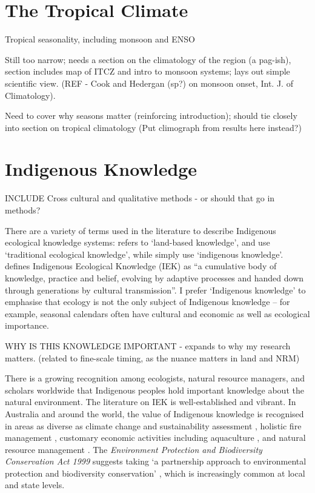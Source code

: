 \section{The Tropical Climate}

Tropical seasonality, including monsoon and ENSO

Still too narrow; needs a section on the climatology of the region (a pag-ish),
section includes map of ITCZ and intro to monsoon systems; lays out simple scientific view.
(REF - Cook and Hedergan (sp?) on monsoon onset, Int. J. of Climatology).

Need to cover why seasons matter (reinforcing introduction); should tie
closely into section on tropical climatology (Put climograph from results here instead?)





\section{Indigenous Knowledge}

INCLUDE Cross cultural and qualitative methods - or should that go in methods?


There are a variety of terms used in the literature to describe Indigenous 
ecological knowledge systems:  \citet{clarke2009} refers to `land-based knowledge', 
\citet{petheram2010} and \citet{turner2009} use `traditional ecological 
knowledge', while \citet{cochran2015} simply use `indigenous knowledge'.  
\citet{berkes2012} defines Indigenous Ecological Knowledge (IEK) as ``a cumulative 
body of knowledge, practice and belief, evolving by adaptive processes and 
handed down through generations by cultural transmission''.  I prefer 
`Indigenous knowledge' to emphasise that ecology is not the only subject of 
Indigenous knowledge – for example, seasonal calendars often have cultural and 
economic as well as ecological importance.

WHY IS THIS KNOWLEDGE IMPORTANT - expands to why my research matters.
(related to fine-scale timing, as the nuance matters in land and NRM)

There is a growing recognition among ecologists, natural resource managers, and 
scholars worldwide that Indigenous peoples hold important knowledge about the 
natural environment. The literature on IEK is well-established and vibrant.  In 
Australia and around the world, the value of Indigenous knowledge is recognised 
in areas as diverse as climate change and sustainability assessment
\citep[eg.][]{cochran2015}, holistic fire management \citep[eg.][]{clarke2009,price2012}, 
customary economic activities including aquaculture \citep{woodward2012a}, and 
natural resource management \citep[eg.][]{prober2011}.  The \textit{Environment 
Protection and Biodiversity Conservation Act 1999} suggests taking `a 
partnership approach to environmental protection and biodiversity conservation'
\citep{ens2012}, which is increasingly common at local and state levels.  


